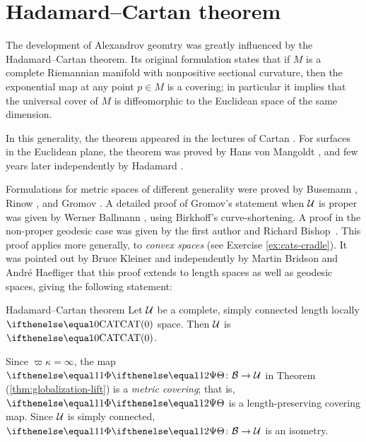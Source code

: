 
\section{Hadamard--Cartan theorem}\label{sec:Hadamard--Cartan}

The development of Alexandrov geomtry was greatly influenced by the Hadamard--Cartan theorem.
Its original formulation states that if $M$ is a complete Riemannian manifold with nonpositive sectional curvature, 
then the exponential map at any point $p\in M$ is a covering;
in particular it implies that the universal cover of $M$ is diffeomorphic to the Euclidean space of the same dimension.

In this generality, the theorem appeared in the lectures of Cartan \cite{cartan}.
For surfaces in the Euclidean plane, 
the theorem was proved by
Hans von Mangoldt \cite{mangoldt},  
and few years later independently by Hadamard \cite{hadamard}.

Formulations for metric spaces of different generality were proved by 
Busemann \cite{busemann-CBA},
Rinow \cite{rinow}, and 
Gromov  \cite[p.~119]{gromov:hyp-groups}. 
A detailed proof of Gromov's statement when $\mathcal{U}$ is proper  was given by Werner Ballmann \cite{ballmann:cartan-hadamard}, using Birkhoff's curve-shortening.  
A proof in the non-proper 
geodesic case 
was given by the first author and Richard Bishop~\cite{alexander-bishop:h-c}.  
This proof applies more generally, to {}\emph{convex spaces} (see Exercise \ref{ex:cats-cradle}).
It was pointed out by Bruce 
Kleiner \cite{ballmann:lectures} 
and independently by Martin 
Bridson and Andr\'{e} 
Haefliger \cite{bridson-haefliger} that 
this proof
extends to length spaces as well as geodesic spaces, giving the following statement:

\begin{thm}{Hadamard--Cartan theorem}
\label{thm:hadamard-cartan}
Let $\mathcal{U}$ be a complete,  simply connected length locally $\CAT0$ space.
Then $\mathcal{U}$ is $\CAT0$.
\end{thm}

 Since $\varpi\kappa=\infty$,
the map $\map\:\spc{B}\to\spc{U}$ in Theorem
(\ref{thm:globalization-lift}) is a \emph{metric covering};
 that is, $\map$ is a length-preserving covering map. 
Since $\mathcal{U}$ is simply connected, $\map\:\spc{B}\to\spc{U}$ is an isometry.
\qeds


